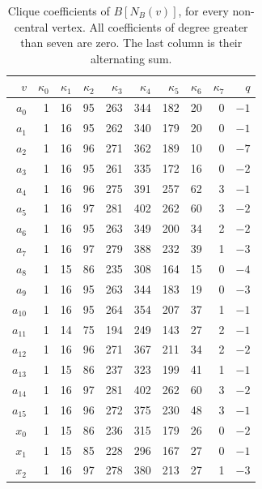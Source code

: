 \begin{table}[H]
\centering\small
\caption{Clique coefficients of \(B[N_B(v)]\), for every non-central
vertex. All coefficients of degree greater than seven are zero.
The last column is their alternating sum.}
\label{4k4:tab:Bq}
\begin{tabular}{r rrrrrrrr r}\toprule
\(v\)&\(\kappa_0\)&\(\kappa_1\)&\(\kappa_2\)&\(\kappa_3\)&\(\kappa_4\)&\(\kappa_5\)&\(\kappa_6\)&\(\kappa_7\)&\(q\)\\\midrule
\(a_{0}\) & 1 & 16 & 95 & 263 & 344 & 182 & 20 & 0 & $-1$\\
\(a_{1}\) & 1 & 16 & 95 & 262 & 340 & 179 & 20 & 0 & $-1$\\
\(a_{2}\) & 1 & 16 & 96 & 271 & 362 & 189 & 10 & 0 & $-7$\\
\(a_{3}\) & 1 & 16 & 95 & 261 & 335 & 172 & 16 & 0 & $-2$\\
\(a_{4}\) & 1 & 16 & 96 & 275 & 391 & 257 & 62 & 3 & $-1$\\
\(a_{5}\) & 1 & 16 & 97 & 281 & 402 & 262 & 60 & 3 & $-2$\\
\(a_{6}\) & 1 & 16 & 95 & 263 & 349 & 200 & 34 & 2 & $-2$\\
\(a_{7}\) & 1 & 16 & 97 & 279 & 388 & 232 & 39 & 1 & $-3$\\
\(a_{8}\) & 1 & 15 & 86 & 235 & 308 & 164 & 15 & 0 & $-4$\\
\(a_{9}\) & 1 & 16 & 95 & 263 & 344 & 183 & 19 & 0 & $-3$\\
\(a_{10}\) & 1 & 16 & 95 & 264 & 354 & 207 & 37 & 1 & $-1$\\
\(a_{11}\) & 1 & 14 & 75 & 194 & 249 & 143 & 27 & 2 & $-1$\\
\(a_{12}\) & 1 & 16 & 96 & 271 & 367 & 211 & 34 & 2 & $-2$\\
\(a_{13}\) & 1 & 15 & 86 & 237 & 323 & 199 & 41 & 1 & $-1$\\
\(a_{14}\) & 1 & 16 & 97 & 281 & 402 & 262 & 60 & 3 & $-2$\\
\(a_{15}\) & 1 & 16 & 96 & 272 & 375 & 230 & 48 & 3 & $-1$\\
\(x_0\) & 1 & 15 & 86 & 236 & 315 & 179 & 26 & 0 & $-2$\\
\(x_1\) & 1 & 15 & 85 & 228 & 296 & 167 & 27 & 0 & $-1$\\
\(x_2\) & 1 & 16 & 97 & 278 & 380 & 213 & 27 & 1 & $-3$\\
\bottomrule\end{tabular}
\end{table}
